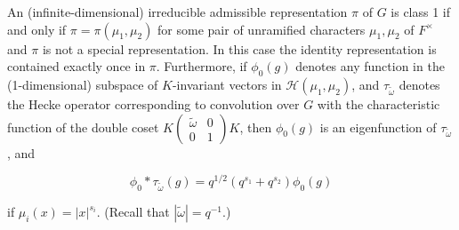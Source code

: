 \begin{theorem}\label{thm:4.23}

An (infinite-dimensional) irreducible admissible representation $\pi$ of $G$ is class 1 if and only if $\pi = \pi(\mu_1, \mu_2)$ for some pair of unramified characters $\mu_1, \mu_2$ of $F^{\times}$ and $\pi$ is not a special representation. In this case the identity representation is contained exactly once in $\pi$. Furthermore, if $\phi_0(g)$ denotes any function in the (1-dimensional) subspace of $K$-invariant vectors in $\mathcal{H}(\mu_1, \mu_2)$, and $\tau_{\widetilde{\omega}}$ denotes the Hecke operator corresponding to convolution over $G$ with the characteristic function of the double coset $K\begin{pmatrix} \widetilde{\omega} & 0 \\ 0 & 1 \end{pmatrix}K$, then $\phi_0(g)$ is an eigenfunction of $\tau_{\widetilde{\omega}}$, and

\begin{equation}\label{eq:4.16}
\phi_0 * \tau_{\widetilde{\omega}}(g) = q^{1/2}(q^{s_1} + q^{s_2})\phi_0(g)\tag{4.16}
\end{equation}

if $\mu_i(x) = |x|^{s_i}$. (Recall that $|\widetilde{\omega}| = q^{-1}$.)

\end{theorem}

